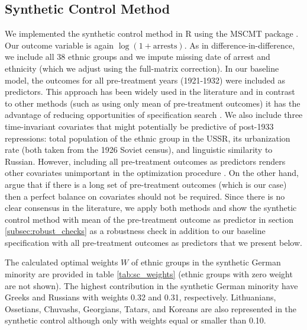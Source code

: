 \subsection{Synthetic Control Method}
We implemented the synthetic control method in R  using the MSCMT package \citep{becker_fast_2018}.
Our outcome variable is again $\log\left(1 + \text{arrests}\right)$.
As in difference-in-difference, we include all 38 ethnic groups and we impute missing date of arrest and ethnicity (which we adjust using the full-matrix correction).
In our baseline model, the  outcomes for all pre-treatment years (1921-1932)  were included  as predictors. 
This approach has been widely used in the literature \citep{billmeier_assessing_2013, cavallo_catastrophic_2013, bohn_did_2014} and in contrast to other methods (such as using only mean of pre-treatment outcomes) it  has the advantage  of reducing opportunities of specification search  \citep{ferman_cherry_2018}. 
We also include three time-invariant covariates that might potentially be predictive of post-1933 repressions: total population of the ethnic group in the USSR, its urbanization rate (both taken from the 1926 Soviet census), and linguistic similarity to Russian. 
However, including all pre-treatment outcomes as predictors  renders  other  covariates unimportant in the optimization procedure \citep{kaul_synthetic_2018}. On the other hand, \citet{botosaru_role_2019} argue that if there is a long set of pre-treatment outcomes (which is our case) then a perfect balance on covariates should not be required.
Since there is no clear consensus in the literature, we apply both methods and show the synthetic control method with mean of the pre-treatment outcome as predictor in section \ref{subsec:robust_checks} as a robustness check in addition to our baseline specification with  all pre-treatment outcomes as predictors that we present below. 



The calculated optimal weights $W$ of ethnic groups in the synthetic German minority are provided in table \ref{tab:sc_weights} (ethnic groups with zero weight are not shown). The highest contribution in the synthetic German minority have Greeks and Russians  with weights 0.32 and 0.31, respectively.  Lithuanians, Ossetians, Chuvashs, Georgians, Tatars, and Koreans  are also represented in the synthetic control although only with  weights equal or smaller than 0.10. 


